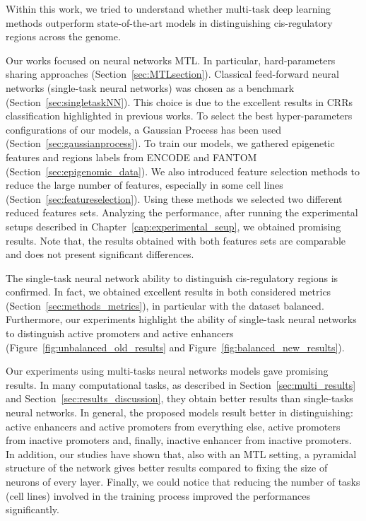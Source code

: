 Within this work, we tried to understand whether multi-task deep learning methods outperform state-of-the-art models in distinguishing cis-regulatory regions across the genome. 

Our works focused on neural networks MTL. In particular, hard-parameters sharing approaches (Section~\ref{sec:MTLsection}). Classical feed-forward neural networks (single-task neural networks) was chosen as a benchmark (Section~\ref{sec:singletaskNN}). This choice is due to the excellent results in CRRs classification highlighted in previous works. To select the best hyper-parameters configurations of our models, a Gaussian Process has been used (Section~\ref{sec:gaussianprocess}).
To train our models, we gathered epigenetic features and regions labels from ENCODE and FANTOM (Section~\ref{sec:epigenomic_data}). We also introduced feature selection methods to reduce the large number of features, especially in some cell lines (Section~\ref{sec:featureselection}). Using these methods we selected two different reduced features sets. 
Analyzing the performance, after running the experimental setups described in Chapter~\ref{cap:experimental_seup}, we obtained promising results. Note that, the results obtained with both features sets are comparable and does not present significant differences. 

The single-task neural network ability to distinguish cis-regulatory regions is confirmed. In fact, we obtained excellent results in both considered metrics (Section~\ref{sec:methods_metrics}), in particular with the dataset balanced. Furthermore, our experiments highlight the ability of single-task neural networks to distinguish active promoters and active enhancers (Figure~\ref{fig:unbalanced_old_results} and Figure~\ref{fig:balanced_new_results}).

Our experiments using multi-tasks neural networks models gave promising results. In many computational tasks, as described in Section~\ref{sec:multi_results} and Section~\ref{sec:results_discussion}, they obtain better results than single-tasks neural networks.
In general, the proposed models result better in distinguishing: active enhancers and active promoters from everything else, active promoters from inactive promoters and, finally, inactive enhancer from inactive promoters. In addition, our studies have shown that, also with an MTL setting, a pyramidal structure of the network gives better results compared to fixing the size of neurons of every layer. 
Finally, we could notice that reducing the number of tasks (cell lines) involved in the training process improved the performances significantly. 

